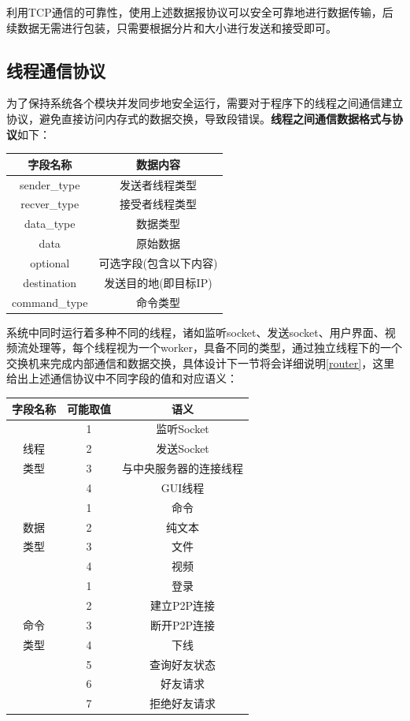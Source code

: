\documentclass[UTF8]{ctexart}
\begin{document}
利用TCP通信的可靠性，使用上述数据报协议可以安全可靠地进行数据传输，后续数据无需进行包装，只需要根据分片和大小进行发送和接受即可。



\subsection{线程通信协议}\label{thread}

为了保持系统各个模块并发同步地安全运行，需要对于程序下的线程之间通信建立协议，避免直接访问内存式的数据交换，导致段错误。\textbf{线程之间通信数据格式与协议}如下：
\begin{table}[H]
    \centering
    \begin{tabular}{cc}
        \hline
        字段名称 & 数据内容 \\
        \hline
        sender\_type & 发送者线程类型\\
        recver\_type & 接受者线程类型\\
        data\_type & 数据类型\\
        data & 原始数据 \\
        optional & 可选字段(包含以下内容)\\
        destination & 发送目的地(即目标IP)\\
        command\_type&命令类型\\
        \hline
    \end{tabular}
\end{table}

系统中同时运行着多种不同的线程，诸如监听socket、发送socket、用户界面、视频流处理等，每个线程视为一个worker，具备不同的类型，通过独立线程下的一个交换机来完成内部通信和数据交换，具体设计下一节将会详细说明\ref{router}，这里给出上述通信协议中不同字段的值和对应语义：
\begin{table}[H]
    \centering
    \begin{tabular}{ccc}
        \hline
        字段名称 & 可能取值 & 语义\\
        \hline
        & 1 & 监听Socket\\
        线程&2&发送Socket\\
        类型&3&与中央服务器的连接线程\\
        &4&GUI线程\\
        \hline
        &1&命令\\
        数据&2&纯文本\\
        类型&3&文件\\
        &4&视频\\
        \hline
        &1&登录\\
        &2&建立P2P连接\\
        命令&3&断开P2P连接\\
        类型&4&下线\\
        &5&查询好友状态\\
        &6&好友请求\\
        &7&拒绝好友请求\\
        \hline
    \end{tabular}
\end{table}
\end{document}
